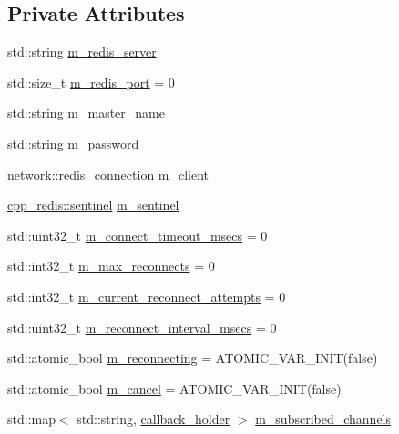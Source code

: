 \subsection*{Private Attributes}
\begin{DoxyCompactItemize}
\item 
std\+::string \hyperlink{classcpp__redis_1_1subscriber_ab3001cb0e748940490039b59efc5be7d}{m\+\_\+redis\+\_\+server}
\item 
std\+::size\+\_\+t \hyperlink{classcpp__redis_1_1subscriber_a606e99982af301b722cc1ebe8c1889bc}{m\+\_\+redis\+\_\+port} = 0
\item 
std\+::string \hyperlink{classcpp__redis_1_1subscriber_a79e64728d9f6094fdd5c24418b889f19}{m\+\_\+master\+\_\+name}
\item 
std\+::string \hyperlink{classcpp__redis_1_1subscriber_a05f90439d1da469a1184651eea89c015}{m\+\_\+password}
\item 
\hyperlink{classcpp__redis_1_1network_1_1redis__connection}{network\+::redis\+\_\+connection} \hyperlink{classcpp__redis_1_1subscriber_ac982bd5661f59b8e2021dbdb80615e38}{m\+\_\+client}
\item 
\hyperlink{classcpp__redis_1_1sentinel}{cpp\+\_\+redis\+::sentinel} \hyperlink{classcpp__redis_1_1subscriber_a74ea9dc2c41fa4bc3b19f6ae2a3c2513}{m\+\_\+sentinel}
\item 
std\+::uint32\+\_\+t \hyperlink{classcpp__redis_1_1subscriber_a2fd648e01a4b88d63b6b977e0b694fa5}{m\+\_\+connect\+\_\+timeout\+\_\+msecs} = 0
\item 
std\+::int32\+\_\+t \hyperlink{classcpp__redis_1_1subscriber_a8c22f20f5a196eb72233d203b102bf3c}{m\+\_\+max\+\_\+reconnects} = 0
\item 
std\+::int32\+\_\+t \hyperlink{classcpp__redis_1_1subscriber_aff7a8222048ec5aa398a8a45e64ff260}{m\+\_\+current\+\_\+reconnect\+\_\+attempts} = 0
\item 
std\+::uint32\+\_\+t \hyperlink{classcpp__redis_1_1subscriber_a61fb1560948d3ddaff3b322c30e7a8a7}{m\+\_\+reconnect\+\_\+interval\+\_\+msecs} = 0
\item 
std\+::atomic\+\_\+bool \hyperlink{classcpp__redis_1_1subscriber_a71517f71ac616e52b48e371be291665b}{m\+\_\+reconnecting} = A\+T\+O\+M\+I\+C\+\_\+\+V\+A\+R\+\_\+\+I\+N\+IT(false)
\item 
std\+::atomic\+\_\+bool \hyperlink{classcpp__redis_1_1subscriber_a66dd15a4eb08cf3ed7e926a83b10cc9f}{m\+\_\+cancel} = A\+T\+O\+M\+I\+C\+\_\+\+V\+A\+R\+\_\+\+I\+N\+IT(false)
\item 
std\+::map$<$ std\+::string, \hyperlink{structcpp__redis_1_1subscriber_1_1callback__holder}{callback\+\_\+holder} $>$ \hyperlink{classcpp__redis_1_1subscriber_aa0e98504b640b44f23577ed2f8e30f74}{m\+\_\+subscribed\+\_\+channels}

\end{DoxyCompactItemize}
